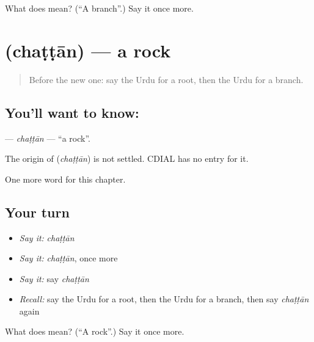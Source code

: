 \begin{tcolorbox}[breakable,colback=teal!4,colframe=teal!35!black,title={Before you move on}]
What does  mean? (\textquotedblleft{}A branch\textquotedblright{}.) Say it once more.
\end{tcolorbox}
\section[\texorpdfstring{\ur{چٹان} (chaṭṭān)}{چٹان (chaṭṭān)}]{ (chaṭṭān) — a rock}

\label{lesson:UR-C124-chattan}



\begin{quote}
Before the new one: say the Urdu for a root, then the Urdu for a branch.
\end{quote}

\subsection*{You'll want to know: }
\textbf{} — \emph{chaṭṭān} — \textquotedblleft{}a rock\textquotedblright{}.

\begin{cousinweb}
The origin of \textbf{} (\emph{chaṭṭān}) is not settled. CDIAL has no entry for it.
\end{cousinweb}

\begin{grammarlens}[title={What you've built}]
One more word for this chapter.
\end{grammarlens}

\subsection*{Your turn}
\begin{itemize}
\raggedright
  \item \emph{Say it:} \emph{chaṭṭān}
  \item \emph{Say it:} \emph{chaṭṭān}, once more
  \item \emph{Say it:} say \emph{chaṭṭān}
  \item \emph{Recall:} say the Urdu for a root, then the Urdu for a branch, then say \emph{chaṭṭān} again
\end{itemize}

\begin{tcolorbox}[breakable,colback=teal!4,colframe=teal!35!black,title={Before you move on}]
What does  mean? (\textquotedblleft{}A rock\textquotedblright{}.) Say it once more.
\end{tcolorbox}
